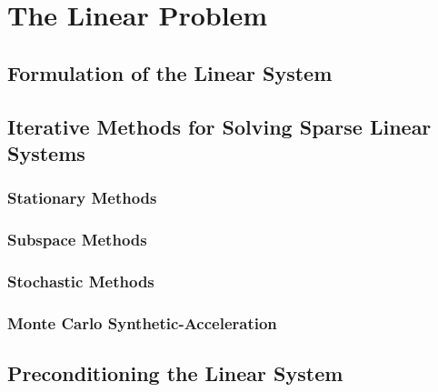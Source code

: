 \chapter{The Linear Problem}
\label{ch:linear_problem}

\section{Formulation of the Linear System}
\label{sec:linear_system}

\section{Iterative Methods for Solving Sparse Linear Systems}
\label{sec:linear_methods}

\subsection{Stationary Methods}
\label{subsec:stationary_methods}

\subsection{Subspace Methods}
\label{subsec:subspace_methods}

\subsection{Stochastic Methods}
\label{subsec:stochastic_methods}

\subsection{Monte Carlo Synthetic-Acceleration}
\label{subsec:mcsa}

\section{Preconditioning the Linear System}
\label{sec:linear_preconditioning}
